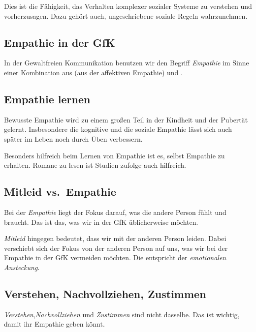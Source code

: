 Dies ist die Fähigkeit, das Verhalten komplexer sozialer Systeme zu verstehen und vorherzusagen. Dazu gehört auch, ungeschriebene soziale Regeln wahrzunehmen.

\subsection{Empathie in der GfK}

In der Gewaltfreien Kommunikation benutzen wir den Begriff \emph{Empathie} im Sinne einer Kombination aus  (aus der affektiven Empathie) und .

\subsection{Empathie lernen}

Bewusste Empathie wird zu einem großen Teil in der Kindheit und der Pubertät gelernt. Insbesondere die kognitive und die soziale Empathie lässt sich auch später im Leben noch durch Üben verbessern.

Besonders hilfreich beim Lernen von Empathie ist es, selbst Empathie zu erhalten. Romane zu lesen ist Studien zufolge auch hilfreich.

\subsection{Mitleid vs.~Empathie}
\label{mitleid}

Bei der \emph{Empathie} liegt der Fokus darauf, was die andere Person fühlt und braucht. Das ist das, was wir in der GfK üblicherweise möchten.

\emph{Mitleid} hingegen bedeutet, dass wir mit der anderen Person leiden. Dabei verschiebt sich der Fokus von der anderen Person auf uns, was wir bei der Empathie in der GfK vermeiden möchten. Die entspricht der \emph{emotionalen Ansteckung}.

\subsection{Verstehen, Nachvollziehen, Zustimmen}

\emph{Verstehen},\emph{Nachvollziehen} und \emph{Zustimmen} sind nicht dasselbe. Das ist wichtig, damit ihr Empathie geben könnt.

